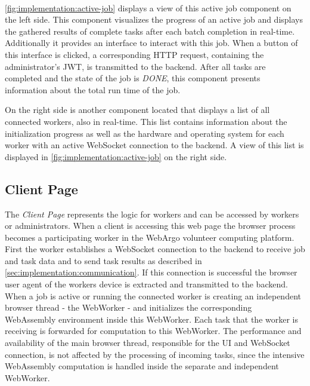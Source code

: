 ~\\
\autoref{fig:implementation:active-job} displays a view of this active job component on the left side. This component visualizes the progress of an active job and displays the gathered results of complete tasks after each batch completion in real-time. Additionally it provides an interface to interact with this job. When a button of this interface is clicked, a corresponding \acs{HTTP} request, containing the administrator's \ac{JWT}, is transmitted to the backend. After all tasks are completed and the state of the job is \emph{DONE}, this component presents information about the total run time of the job. 

On the right side is another component located that displays a list of all connected workers, also in real-time. This list contains information about the initialization progress as well as the hardware and operating system for each worker with an active WebSocket connection to the backend. A view of this list is displayed in \autoref{fig:implementation:active-job} on the right side.

\subsection{Client Page}
\label{subsec:implementation:client-page}
The \emph{Client Page} represents the logic for workers and can be accessed by workers or administrators. When a client is accessing this web page the browser process becomes a participating worker in the WebArgo volunteer computing platform. First the worker establishes a WebSocket connection to the backend to receive job and task data and to send task results as described in \autoref{sec:implementation:communication}. If this connection is successful the browser user agent of the workers device is extracted and transmitted to the backend. When a job is active or running the connected worker is creating an independent browser thread - the WebWorker - and initializes the corresponding WebAssembly environment inside this WebWorker. Each task that the worker is receiving is forwarded for computation to this WebWorker. The performance and availability of the main browser thread, responsible for the \ac{UI} and WebSocket connection, is not affected by the processing of incoming tasks, since the intensive WebAssembly computation is handled inside the separate and independent WebWorker.

